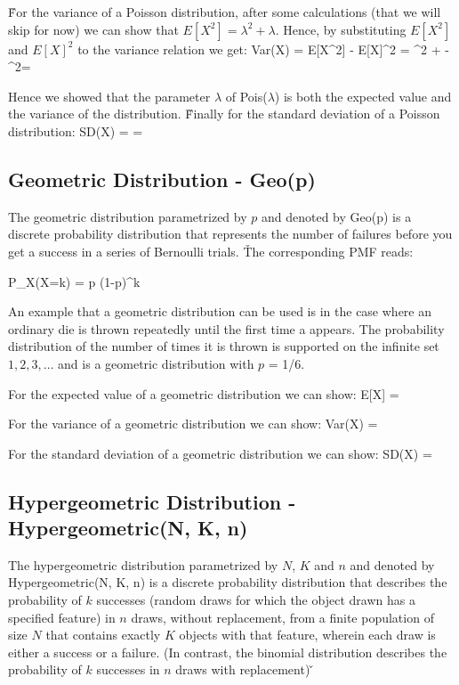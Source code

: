 \v

For the variance of a Poisson distribution, after some calculations (that we will skip for now) we can show that
$E[X^2] = \lambda^2 + \lambda$. Hence, by substituting $E[X^2]$ and $E[X]^2$ to the variance relation we get:
\bse
Var(X) = E[X^{2}] - E[X]^{2} = \lambda^2 + \lambda - \lambda^2= \lambda
\ese

Hence we showed that the parameter $\lambda$ of Pois($\lambda$) is both the expected value and the variance of the
distribution. \v

Finally for the standard deviation of a Poisson distribution:
\bse
SD(X) =  = \sqrt{\lambda}
\ese

\subsection{Geometric Distribution - Geo(p)}

The geometric distribution parametrized by $p$ and denoted by Geo(p) is a discrete probability distribution that
represents the number of failures before you get a success in a series of Bernoulli trials. \v

The corresponding PMF reads:

\bse
P_{X}(X=k) = p (1-p)^k
\ese
\ed

\be
An example that a geometric distribution can be used is in the case where an ordinary die is thrown repeatedly until
the first time a  appears. The probability distribution of the number of times it is thrown is supported on
the infinite set ${1,2,3, \ldots}$ and is a geometric distribution with $p$ = 1/6.
\ee

For the expected value of a geometric distribution we can show:
\bse
E[X] = 
\ese

For the variance of a geometric distribution we can show:
\bse
Var(X) = 
\ese

For the standard deviation of a geometric distribution we can show:
\bse
SD(X) = 
\ese

\subsection{Hypergeometric Distribution - Hypergeometric(N, K, n)}

The hypergeometric distribution parametrized by $N$, $K$ and $n$ and denoted by Hypergeometric(N, K, n) is a discrete
probability distribution that describes the probability of $k$ successes (random draws for which the object drawn has
a specified feature) in $n$ draws, without replacement, from a finite population of size $N$ that contains exactly
$K$ objects with that feature, wherein each draw is either a success or a failure. (In contrast, the binomial
distribution describes the probability of $k$ successes in $n$ draws with replacement) \v

